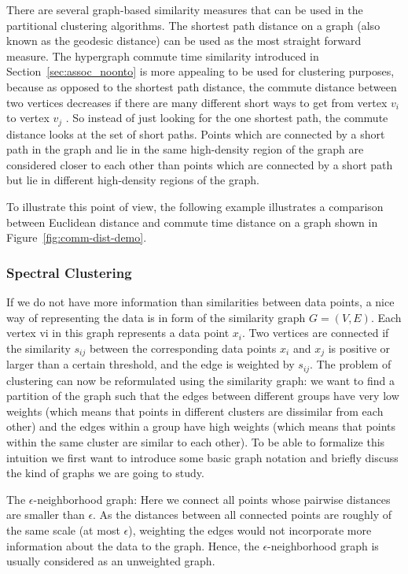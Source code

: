 There are several graph-based similarity measures that can be used in the partitional clustering algorithms. The shortest path distance on a graph (also known as the geodesic distance) can be used as the most straight forward measure.
The hypergraph commute time similarity introduced in Section~\ref{sec:assoc_noonto} is more appealing to be used for clustering purposes, because as opposed to the shortest path distance, the commute distance between two vertices decreases if there are many different short ways to get from vertex $v_i$ to vertex $v_j$ . So instead of just looking for the one shortest path, the commute distance looks at the set of short paths. Points which are connected by a short path in the graph and lie in the same high-density region of the graph are considered closer to each other than points which are connected by a short path but lie in different high-density regions of the graph.

To illustrate this point of view, the following example illustrates a comparison between Euclidean distance and commute time distance on a graph shown in Figure~\ref{fig:comm-dist-demo}.



\subsubsection{Spectral Clustering}
If we do not have more information than similarities between data points, a nice way of representing the data is in form of the similarity graph $G = (V,E)$. Each vertex vi in this graph represents a data point $x_i$. Two vertices are connected if the similarity $s_{ij}$ between the corresponding data points $x_i$ and $x_j$ is positive or larger than a certain threshold, and the edge is weighted by $s_{ij}$. The problem of clustering can now be reformulated using the similarity graph: we want to find a partition of the graph such that the edges between different groups have very low weights (which means that points in different clusters are dissimilar from each other) and the edges within a group have high weights (which means that points within the same cluster are similar to each other). To be able to formalize this intuition we first want to introduce some basic graph notation and briefly discuss the kind of graphs we are going to study.

The $\epsilon$-neighborhood graph: Here we connect all points whose pairwise distances are smaller than $\epsilon$. As the distances between all connected points are roughly of the same scale (at most $\epsilon$), weighting the edges would not incorporate more information about the data to the graph. Hence, the $\epsilon$-neighborhood graph is usually considered as an unweighted graph.

